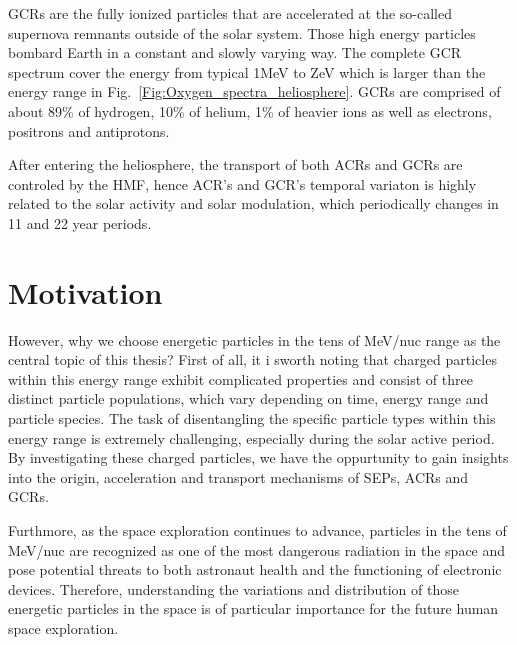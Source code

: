 \acp{GCR} are the fully ionized particles that are accelerated at the so-called supernova remnants \citep{Blasi2013AARv2013} outside of the solar system. Those high energy particles bombard Earth in a constant and slowly varying way. The complete GCR spectrum cover the energy from typical 1MeV \citep{Potgieter2013LRSP} to ZeV which is larger than the energy range in Fig.~\ref{Fig:Oxygen_spectra_heliosphere}. \acp{GCR} are comprised of about 89\% of hydrogen, 10\% of helium, 1\% of heavier ions as well as electrons, positrons and antiprotons. 

After entering the heliosphere, the transport of both \acp{ACR} and \acp{GCR} are controled by the \ac{HMF}, hence \ac{ACR}'s and \ac{GCR}'s temporal variaton is highly related to the solar activity and solar modulation, which periodically changes in 11 and 22 year periods. 









\section{Motivation}
However, why we choose energetic particles in the tens of MeV/nuc range as the central topic of this thesis? First of all, it i sworth noting that charged particles within this energy range exhibit complicated properties and consist of three distinct particle populations, which vary depending on time, energy range and particle species. The task of disentangling the specific particle types within this energy range is extremely challenging, especially during the solar active period.
By investigating these charged particles, we have the oppurtunity to gain insights into the origin, acceleration and transport mechanisms of \acp{SEP}, \acp{ACR} and \acp{GCR}.

Furthmore, as the space exploration continues to advance, particles in the tens of MeV/nuc are recognized as one of the most dangerous radiation in the space and pose potential threats to both astronaut health and the functioning of electronic devices. Therefore, understanding the variations and distribution of those energetic particles in the space is of particular importance for the future human space exploration.

